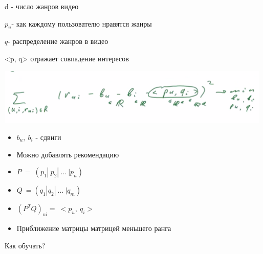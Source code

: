 \documentclass[a4paper, 12pt]{article}
\begin{document}
d - число жанров видео

\(p_{u}\)- как каждому пользователю нравятся жанры

\(q\)- распределение жанров в видео

\textless{}p, q\textgreater{} отражает совпадение интересов

\includegraphics[width=5.18611in,height=1.06005in]{media/image3.png}

\begin{itemize}
\item
  
  \(b_{u},\ b_{i}\) - сдвиги
  
\end{itemize}

\begin{itemize}
\item
  
  Можно добавлять рекомендацию
  
\item
  
  \(P\  = \ (p_{1}|\ p_{2}|\ ...\ |p_{n})\)
  
\item
  
  \(Q\  = (q_{1}|q_{2}|\ ...\ |q_{m})\ \)
  
\item
  
  \((P^{T}Q)_{\text{ui}} = \  < p_{u},\ q_{i} >\)
  
\item
  
  Приближение матрицы матрицей меньшего ранга
  
\end{itemize}

{Как обучать?}
\end{document}
